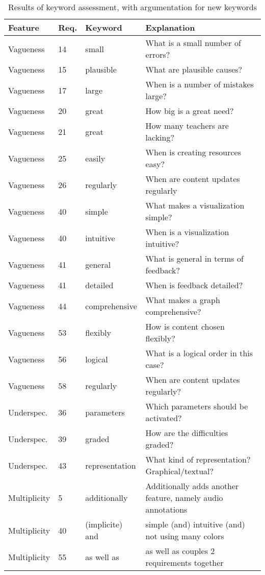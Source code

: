 \documentclass[a4paper,11pt]{article}
\begin{document}
			\begin{table}[h!]
				\begin{tabular}{l | l | l | p{7cm}}
					Feature & Req. & Keyword & Explanation \\ \hline
					Vagueness & 14 & small & What is a small number of errors? \\
					Vagueness & 15 & plausible & What are plausible causes? \\
					Vagueness & 17 & large & When is a number of mistakes large? \\
					Vagueness & 20 & great & How big is a great need? \\
					Vagueness & 21 & great & How many teachers are lacking? \\
					Vagueness & 25 & easily & When is creating resources easy? \\
					Vagueness & 26 & regularly & When are content updates regularly \\
					Vagueness & 40 & simple & What makes a visualization simple? \\
					Vagueness & 40 & intuitive & When is a visualization intuitive? \\
					Vagueness & 41 & general & What is general in terms of feedback? \\
					Vagueness & 41 & detailed & When is feedback detailed? \\
					Vagueness & 44 & comprehensive & What makes a graph comprehensive? \\
					Vagueness & 53 & flexibly & How is content chosen flexibly? \\
					Vagueness & 56 & logical & What is a logical order in this case? \\
					Vagueness & 58 & regularly & When are content updates regularly? \\
					Underspec. & 36 & parameters & Which parameters should be activated? \\
					Underspec. & 39 & graded & How are the difficulties graded? \\
					Underspec. & 43 & representation & What kind of representation? Graphical/textual? \\
					Multiplicity & 5 & additionally & Additionally adds another feature, namely audio annotations \\
					Multiplicity & 40 & (implicite) and & simple (and) intuitive (and) not using many colors \\
					Multiplicity & 55 & as well as & as well as couples 2 requirements together \\
				\end{tabular}
				\caption{Results of keyword assessment, with argumentation for new keywords}
				\label{table:keywords2}
			\end{table}
\end{document}
